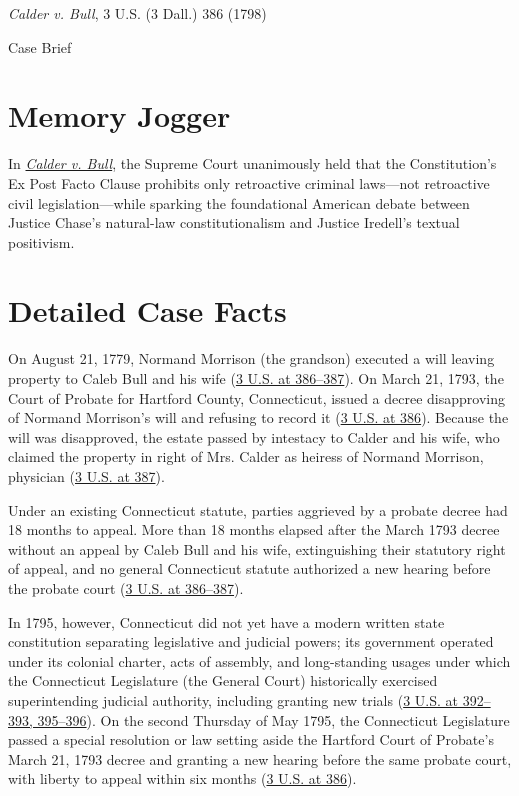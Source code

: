 \documentclass[12pt]{article}
\begin{document}
\begin{center}
{\LARGE \textit{Calder v. Bull}, 3 U.S. (3 Dall.) 386 (1798)\par}
\vspace{0.8em}
{\large Case Brief\par}
\end{center}
\vspace{1em}

\section{Memory Jogger}

In \href{https://www.courtlistener.com/opinion/84695/calder-v-bull/}{\textit{Calder v. Bull}}, the Supreme Court unanimously held that the Constitution's Ex Post Facto Clause prohibits only retroactive criminal laws---not retroactive civil legislation---while sparking the foundational American debate between Justice Chase's natural-law constitutionalism and Justice Iredell's textual positivism.

\section{Detailed Case Facts}

On August 21, 1779, Normand Morrison (the grandson) executed a will leaving property to Caleb Bull and his wife (\href{https://supreme.justia.com/cases/federal/us/3/386/}{3 U.S. at 386--387}). On March 21, 1793, the Court of Probate for Hartford County, Connecticut, issued a decree disapproving of Normand Morrison's will and refusing to record it (\href{https://supreme.justia.com/cases/federal/us/3/386/}{3 U.S. at 386}). Because the will was disapproved, the estate passed by intestacy to Calder and his wife, who claimed the property in right of Mrs. Calder as heiress of Normand Morrison, physician (\href{https://supreme.justia.com/cases/federal/us/3/386/}{3 U.S. at 387}).

Under an existing Connecticut statute, parties aggrieved by a probate decree had 18 months to appeal. More than 18 months elapsed after the March 1793 decree without an appeal by Caleb Bull and his wife, extinguishing their statutory right of appeal, and no general Connecticut statute authorized a new hearing before the probate court (\href{https://supreme.justia.com/cases/federal/us/3/386/}{3 U.S. at 386--387}).

In 1795, however, Connecticut did not yet have a modern written state constitution separating legislative and judicial powers; its government operated under its colonial charter, acts of assembly, and long-standing usages under which the Connecticut Legislature (the General Court) historically exercised superintending judicial authority, including granting new trials (\href{https://press-pubs.uchicago.edu/founders/documents/a1_10_1s10.html}{3 U.S. at 392--393, 395--396}). On the second Thursday of May 1795, the Connecticut Legislature passed a special resolution or law setting aside the Hartford Court of Probate's March 21, 1793 decree and granting a new hearing before the same probate court, with liberty to appeal within six months (\href{https://supreme.justia.com/cases/federal/us/3/386/}{3 U.S. at 386}).
\end{document}
